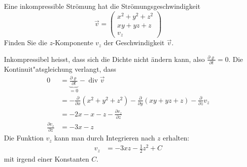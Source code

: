 Eine inkompressible Strömung hat die Strömungsgeschwindigkeit
\[
\vec v = \begin{pmatrix}
x^2+y^2+z^2
\\
xy+yz+z
\\
v_z
\end{pmatrix}
\]
Finden Sie die $z$-Komponente $v_z$ der Geschwindigkeit $\vec v$.

\begin{loesung}
Inkompressibel heisst, dass sich die Dichte nicht ändern kann, also
$\frac{\partial\varrho}{\partial t}=0$.
Die Kontinuit"atsgleichung verlangt, dass
\begin{align*}
0
&=
\underbrace{\frac{\partial\varrho}{\partial t}}_{=0}-\operatorname{div}\vec v
\\
&=
-\frac{\partial}{\partial x}(x^2+y^2+z^2)
-\frac{\partial}{\partial y}(xy+yz+z)
-\frac{\partial}{\partial z}v_z
\\
&=
-2x-x-z-\frac{\partial v_z}{\partial z}
\\
\frac{\partial v_z}{\partial z}
&=
-3x-z
\end{align*}
Die Funktion $v_z$ kann man durch Integrieren nach $z$ erhalten:
\begin{align*}
v_z
&=
-3xz-\frac12z^2+C
\end{align*}
mit irgend einer Konstanten $C$.
\end{loesung}

